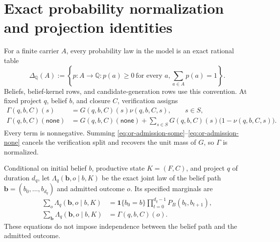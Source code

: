 \section{Exact probability normalization and projection identities}
\label{or:aor-probability-normalization}

For a finite carrier \(A\), every probability law in the model is an exact
rational table
\[
  \Delta_{\mathbb Q}(A):=
  \left\{p:A\to\mathbb Q:
  p(a)\geq0\ \text{for every }a,
  \sum_{a\in A}p(a)=1\right\}.
\]
Beliefs, belief-kernel rows, and candidate-generation rows use this convention.
At fixed project \(q\), belief \(b\), and closure \(C\), verification assigns
\begin{align}
 \Gamma(q,b,C)(s)
   &=G(q,b,C)(s)\nu(q,b,C,s),\qquad s\in S,
   \label{eq:or-admission-some}\\
 \Gamma(q,b,C)(\mathsf{none})
   &=G(q,b,C)(\mathsf{none})
     +\sum_{s\in S}G(q,b,C)(s)
       \bigl(1-\nu(q,b,C,s)\bigr).
   \label{eq:or-admission-none}
\end{align}
Every term is nonnegative. Summing
\eqref{eq:or-admission-some}--\eqref{eq:or-admission-none} cancels the
verification split and recovers the unit mass of \(G\), so \(\Gamma\) is
normalized.

Conditional on initial belief \(b\), productive state \(K=(F,C)\), and
project \(q\) of duration \(d_q\), let
\(\Lambda_q(\mathbf b,o\mid b,K)\) be the exact joint law of the belief path
\(\mathbf b=(b_0,\ldots,b_{d_q})\) and admitted outcome \(o\). Its specified
marginals are
\begin{align}
 \sum_o\Lambda_q(\mathbf b,o\mid b,K)
   &=\mathbf1\{b_0=b\}
     \prod_{t=0}^{d_q-1}P_B(b_t,b_{t+1}),
   \label{eq:or-completion-path-marginal}\\
 \sum_{\mathbf b}\Lambda_q(\mathbf b,o\mid b,K)
   &=\Gamma(q,b,C)(o).
   \label{eq:or-completion-outcome-marginal}
\end{align}
These equations do not impose independence between the belief path and the
admitted outcome.

